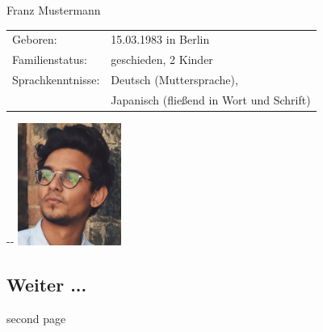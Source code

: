 \documentclass[12pt]{article}
\begin{document}
\thispagestyle{plain}
\begin{minipage}[b][][t]{0.7\textwidth}
{\LARGE \sc Franz Mustermann}

\begin{tabular}{ll}
Geboren: &  15.03.1983 in Berlin \\
Familienstatus: & geschieden, 2 Kinder\\
Sprachkenntnisse: & Deutsch (Muttersprache),\\
& Japanisch (fließend in Wort und Schrift)
\end{tabular}
\end{minipage}
-\hfill-
\includegraphics[height=4cm]{Mustermann}
\subsection*{Weiter ...}
\newpage
second page
\label{LastPage}
\end{document}
